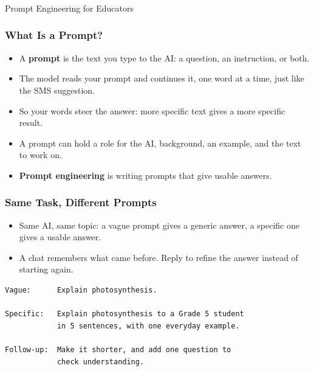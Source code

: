 \begin{frame}[fragile]\frametitle{}
\begin{center}
{\Large Prompt Engineering for Educators}

\end{center}
\end{frame}

\begin{frame}[fragile]\frametitle{What Is a Prompt?}
\begin{itemize}
\item A \textbf{prompt} is the text you type to the AI: a question, an instruction, or both.
\item The model reads your prompt and continues it, one word at a time, just like the SMS suggestion.
\item So your words steer the answer: more specific text gives a more specific result.
\item A prompt can hold a role for the AI, background, an example, and the text to work on.
\item \textbf{Prompt engineering} is writing prompts that give usable answers.
\end{itemize}
\end{frame}

\begin{frame}[fragile]\frametitle{Same Task, Different Prompts}
\begin{itemize}
\item Same AI, same topic: a vague prompt gives a generic answer, a specific one gives a usable answer.
\item A chat remembers what came before. Reply to refine the answer instead of starting again.
\end{itemize}
\begin{lstlisting}[language={}]
Vague:      Explain photosynthesis.

Specific:   Explain photosynthesis to a Grade 5 student
            in 5 sentences, with one everyday example.

Follow-up:  Make it shorter, and add one question to
            check understanding.
\end{lstlisting}
\end{frame}


